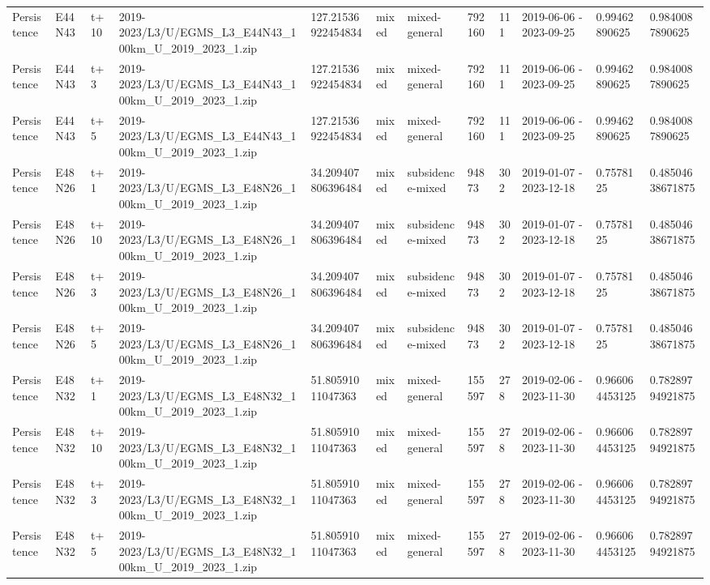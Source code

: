 \begin{landscape}
\begin{longtable}{llllllllllll}
Persistence & E44N43 & t+10 & 2019-2023/L3/U/EGMS\_L3\_E44N43\_100km\_U\_2019\_2023\_1.zip & 127.21536922454834 & mixed & mixed-general & 792160 & 111 & 2019-06-06 - 2023-09-25 & 0.99462890625 & 0.9840087890625 \\
Persistence & E44N43 & t+3 & 2019-2023/L3/U/EGMS\_L3\_E44N43\_100km\_U\_2019\_2023\_1.zip & 127.21536922454834 & mixed & mixed-general & 792160 & 111 & 2019-06-06 - 2023-09-25 & 0.99462890625 & 0.9840087890625 \\
Persistence & E44N43 & t+5 & 2019-2023/L3/U/EGMS\_L3\_E44N43\_100km\_U\_2019\_2023\_1.zip & 127.21536922454834 & mixed & mixed-general & 792160 & 111 & 2019-06-06 - 2023-09-25 & 0.99462890625 & 0.9840087890625 \\
Persistence & E48N26 & t+1 & 2019-2023/L3/U/EGMS\_L3\_E48N26\_100km\_U\_2019\_2023\_1.zip & 34.209407806396484 & mixed & subsidence-mixed & 94873 & 302 & 2019-01-07 - 2023-12-18 & 0.7578125 & 0.48504638671875 \\
Persistence & E48N26 & t+10 & 2019-2023/L3/U/EGMS\_L3\_E48N26\_100km\_U\_2019\_2023\_1.zip & 34.209407806396484 & mixed & subsidence-mixed & 94873 & 302 & 2019-01-07 - 2023-12-18 & 0.7578125 & 0.48504638671875 \\
Persistence & E48N26 & t+3 & 2019-2023/L3/U/EGMS\_L3\_E48N26\_100km\_U\_2019\_2023\_1.zip & 34.209407806396484 & mixed & subsidence-mixed & 94873 & 302 & 2019-01-07 - 2023-12-18 & 0.7578125 & 0.48504638671875 \\
Persistence & E48N26 & t+5 & 2019-2023/L3/U/EGMS\_L3\_E48N26\_100km\_U\_2019\_2023\_1.zip & 34.209407806396484 & mixed & subsidence-mixed & 94873 & 302 & 2019-01-07 - 2023-12-18 & 0.7578125 & 0.48504638671875 \\
Persistence & E48N32 & t+1 & 2019-2023/L3/U/EGMS\_L3\_E48N32\_100km\_U\_2019\_2023\_1.zip & 51.80591011047363 & mixed & mixed-general & 155597 & 278 & 2019-02-06 - 2023-11-30 & 0.966064453125 & 0.78289794921875 \\
Persistence & E48N32 & t+10 & 2019-2023/L3/U/EGMS\_L3\_E48N32\_100km\_U\_2019\_2023\_1.zip & 51.80591011047363 & mixed & mixed-general & 155597 & 278 & 2019-02-06 - 2023-11-30 & 0.966064453125 & 0.78289794921875 \\
Persistence & E48N32 & t+3 & 2019-2023/L3/U/EGMS\_L3\_E48N32\_100km\_U\_2019\_2023\_1.zip & 51.80591011047363 & mixed & mixed-general & 155597 & 278 & 2019-02-06 - 2023-11-30 & 0.966064453125 & 0.78289794921875 \\
Persistence & E48N32 & t+5 & 2019-2023/L3/U/EGMS\_L3\_E48N32\_100km\_U\_2019\_2023\_1.zip & 51.80591011047363 & mixed & mixed-general & 155597 & 278 & 2019-02-06 - 2023-11-30 & 0.966064453125 & 0.78289794921875 \\

\end{longtable}
\end{landscape}
